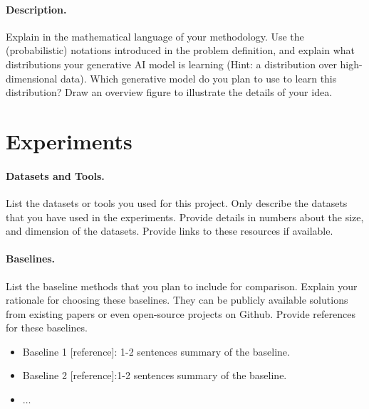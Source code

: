 \documentclass{article}
\newcommand{\new}[1]{{\color{red} #1}}
\begin{document}
\new{\paragraph{Description.}
Explain in the mathematical language of your methodology. Use the (probabilistic) notations introduced in the problem definition, and explain what distributions your generative AI model is learning (Hint: a distribution over high-dimensional data). Which generative model do you plan to use to learn this distribution?    Draw an overview figure to illustrate the details of your idea. 
}


\section{Experiments}
\paragraph{Datasets and Tools.}
List the datasets or tools  you used for this project. Only describe the datasets that you have used in the experiments. Provide details in numbers about the size, and dimension of the datasets. Provide links to these resources if available.

\paragraph{Baselines.}
List the  baseline methods  that you plan to include for comparison. Explain your rationale for choosing these baselines. They can be publicly available solutions from existing papers or even open-source projects on Github. Provide references for these baselines. 
{

\begin{itemize}
    \item Baseline 1 [reference]: 1-2 sentences summary of the baseline.
    \item Baseline 2 [reference]:1-2 sentences summary of the baseline.
    \item $\dots$
\end{itemize}
}
\end{document}
